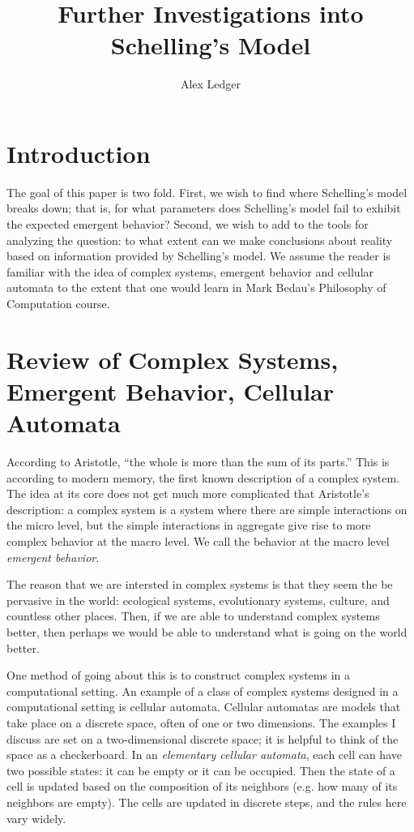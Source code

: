 \documentclass[11pt,twoside]{amsart}
\title{Further Investigations into Schelling's Model}
\author{Alex Ledger}
\date{}
\theoremstyle{theorem}
\theoremstyle{definition}
\theoremstyle{remark}
\begin{document}
\maketitle
\tableofcontents

\newpage

\section{Introduction}
The goal of this paper is two fold. 
First, we wish to find where Schelling's model breaks down; that is, for what parameters does Schelling's model fail to exhibit the expected emergent behavior?
Second, we wish to add to the tools for analyzing the question: to what extent can we make conclusions about reality based on information provided by Schelling's model.
We assume the reader is familiar with the idea of complex systems, emergent behavior and cellular automata to the extent that one would learn in Mark Bedau's Philosophy of Computation course. 


\section{Review of Complex Systems, Emergent Behavior, Cellular Automata}
According to Aristotle, ``the whole is more than the sum of its parts.'' %
This is according to modern memory, the first known description of a complex system.
The idea at its core does not get much more complicated that Aristotle's description: a complex system is a system where there are simple interactions on the micro level, but the simple interactions in aggregate give rise to more complex behavior at the macro level. 
We call the behavior at the macro level \emph{emergent behavior}.

The reason that we are intersted in complex systems is that they seem the be pervasive in the world: ecological systems, evolutionary systems, culture, and countless other places.
Then, if we are able to understand complex systems better, then perhaps we would be able to understand what is going on the world better. 

One method of going about this is to construct complex systems in a computational setting. 
An example of a class of complex systems designed in a computational setting is cellular automata.
Cellular automatas are models that take place on a discrete space, often of one or two dimensions. 
The examples I discuss are set on a two-dimensional discrete space; it is helpful to think of the space as a checkerboard. 
In an \emph{elementary cellular automata}, each cell can have two possible states: it can be empty or it can be occupied.
Then the state of a cell is updated based on the composition of its neighbors (e.g. how many of its neighbors are empty).
The cells are updated in discrete steps, and the rules here vary widely.
\end{document}
